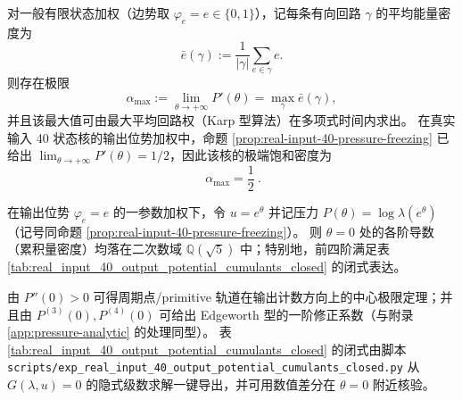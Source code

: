 



\begin{corollary}\label{cor:real-input-40-alpha-max}
对一般有限状态加权（边势取 \(\varphi_e=e\in\{0,1\}\)），记每条有向回路 \(\gamma\) 的平均能量密度为
\[
\bar e(\gamma):=\frac{1}{|\gamma|}\sum_{e\in\gamma} e.
\]
则存在极限
\[
\alpha_{\max}:=\lim_{\theta\to+\infty}P'(\theta)=\max_{\gamma}\bar e(\gamma),
\]
并且该最大值可由最大平均回路权（Karp 型算法）在多项式时间内求出。
在真实输入 40 状态核的输出位势加权中，命题 \ref{prop:real-input-40-pressure-freezing} 已给出
\(\lim_{\theta\to+\infty}P'(\theta)=1/2\)，因此该核的极端饱和密度为
\[
\boxed{\ \alpha_{\max}=\frac12\ }.
\]
\end{corollary}

\begin{proposition}\label{prop:real-input-40-output-cumulants-closed}
在输出位势 \(\varphi_e=e\) 的一参数加权下，令 \(u=e^\theta\) 并记压力
\(
P(\theta)=\log\lambda(e^\theta)
\)
（记号同命题 \ref{prop:real-input-40-pressure-freezing}）。
则 \(\theta=0\) 处的各阶导数（累积量密度）均落在二次数域 \(\mathbb Q(\sqrt5)\) 中；特别地，前四阶满足表 \ref{tab:real_input_40_output_potential_cumulants_closed} 的闭式表达。
\end{proposition}
\begin{remark}\label{rem:real-input-40-output-cumulants-clt}
由 \(P''(0)>0\) 可得周期点/primitive 轨道在输出计数方向上的中心极限定理；并且由 \(P^{(3)}(0),P^{(4)}(0)\) 可给出 Edgeworth 型的一阶修正系数（与附录 \ref{app:pressure-analytic} 的处理同型）。
表 \ref{tab:real_input_40_output_potential_cumulants_closed} 的闭式由脚本 \texttt{scripts/exp\_real\_input\_40\_output\_potential\_cumulants\_closed.py} 从 \(G(\lambda,u)=0\) 的隐式级数求解一键导出，并可用数值差分在 \(\theta=0\) 附近核验。
\end{remark}



